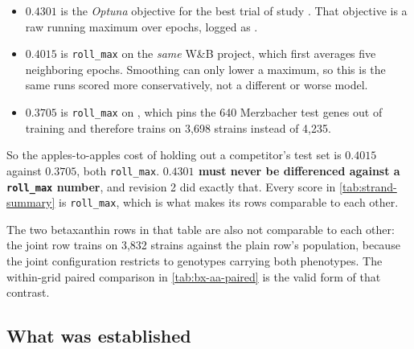 \begin{itemize}
\item $\mathbf{0.4301}$ is the \emph{Optuna} objective for the best trial of study
  . That objective is a raw running maximum over epochs, logged as
  .
\item $\mathbf{0.4015}$ is \texttt{roll\_max} on the \emph{same} W\&B project, which first
  averages five neighboring epochs. Smoothing can only lower a maximum, so this is the same
  runs scored more conservatively, not a different or worse model.
\item $\mathbf{0.3705}$ is \texttt{roll\_max} on , which pins the 640
  Merzbacher test genes out of training and therefore trains on 3,698 strains instead of
  4,235.
\end{itemize}

So the apples-to-apples cost of holding out a competitor's test set is $0.4015$ against
$0.3705$, both \texttt{roll\_max}. \textbf{$0.4301$ must never be differenced against a
\texttt{roll\_max} number}, and revision 2 did exactly that. Every score in
\cref{tab:strand-summary} is \texttt{roll\_max}, which is what makes its rows comparable to
each other.

The two betaxanthin rows in that table are also not comparable to each other: the joint row
trains on 3,832 strains against the plain row's population, because the joint configuration
restricts to genotypes carrying both phenotypes. The within-grid paired comparison in
\cref{tab:bx-aa-paired} is the valid form of that contrast.

\subsection{What was established}

